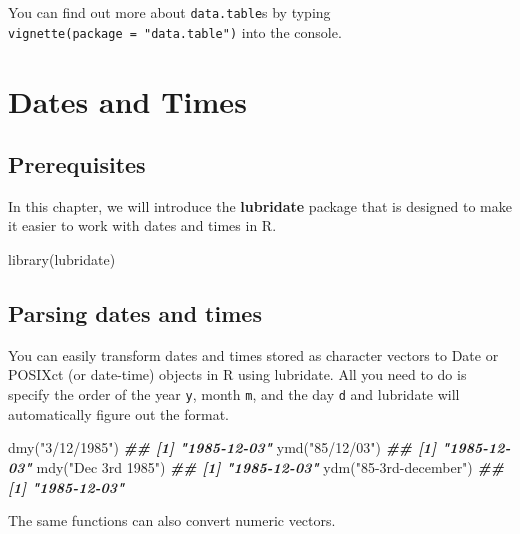 \documentclass[
]{book}
\newenvironment{Shaded}{\begin{snugshade}}{\end{snugshade}}
\newcommand{\DocumentationTok}[1]{\textcolor[rgb]{0.56,0.35,0.01}{\textbf{\textit{#1}}}}
\newcommand{\FunctionTok}[1]{\textcolor[rgb]{0.00,0.00,0.00}{#1}}
\newcommand{\NormalTok}[1]{#1}
\newcommand{\StringTok}[1]{\textcolor[rgb]{0.31,0.60,0.02}{#1}}
\begin{document}
You can find out more about \texttt{data.table}s by typing \texttt{vignette(package\ =\ "data.table")} into the console.

\hypertarget{datetime}{%
\chapter{Dates and Times}\label{datetime}}

\hypertarget{prerequisites-2}{%
\section{Prerequisites}\label{prerequisites-2}}

In this chapter, we will introduce the \textbf{lubridate} package that is designed to make it easier to work with dates and times in R.

\begin{Shaded}
\begin{Highlighting}[]
\FunctionTok{library}\NormalTok{(lubridate)}
\end{Highlighting}
\end{Shaded}

\hypertarget{parsing-dates-and-times}{%
\section{Parsing dates and times}\label{parsing-dates-and-times}}

You can easily transform dates and times stored as character vectors to Date or POSIXct (or date-time) objects in R using lubridate. All you need to do is specify the order of the year \texttt{y}, month \texttt{m}, and the day \texttt{d} and lubridate will automatically figure out the format.

\begin{Shaded}
\begin{Highlighting}[]
\FunctionTok{dmy}\NormalTok{(}\StringTok{"3/12/1985"}\NormalTok{)}
\DocumentationTok{\#\# [1] "1985{-}12{-}03"}
\FunctionTok{ymd}\NormalTok{(}\StringTok{"85/12/03"}\NormalTok{)}
\DocumentationTok{\#\# [1] "1985{-}12{-}03"}
\FunctionTok{mdy}\NormalTok{(}\StringTok{"Dec 3rd 1985"}\NormalTok{)}
\DocumentationTok{\#\# [1] "1985{-}12{-}03"}
\FunctionTok{ydm}\NormalTok{(}\StringTok{"85{-}3rd{-}december"}\NormalTok{)}
\DocumentationTok{\#\# [1] "1985{-}12{-}03"}
\end{Highlighting}
\end{Shaded}

The same functions can also convert numeric vectors.
\end{document}
